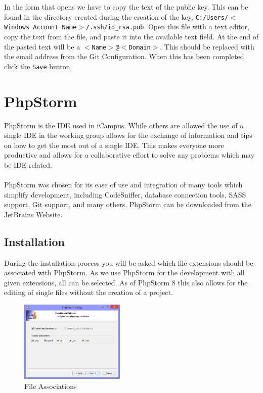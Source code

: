 \documentclass[]{report}
\begin{document}
\noindent
In the form that opens we have to copy the text of the public key. This can be found in the directory created during the creation of the key, \texttt{C:/Users/$<$Windows Account Name$>$/.ssh/id\_rsa.pub}. Open this file with a text editor, copy the text from the file, and paste it into the available text field. At the end of the pasted text will be a \texttt{$<$Name$>$@$<$Domain$>$}. This should be replaced with the email address from the Git Configuration. When this has been completed click the \texttt{Save} button.

\section{PhpStorm}
\label{sec:PHP-Storm}

PhpStorm is the IDE used in iCampus. While others are allowed the use of a single IDE in the working group allows for the exchange of information and tips on how to get the most out of a single IDE. This makes everyone more productive and allows for a collaborative effort to solve any problems which may be IDE related.\\
\\
PhpStorm was chosen for its ease of use and integration of many tools which simplify development, including CodeSniffer, database connection tools, SASS support, Git support, and many others. PhpStorm can be downloaded from the \href{http://www.jetbrains.com/phpstorm/}{JetBrains Website}.

\subsection{Installation}
During the installation process you will be asked which file extensions should be associated with PhpStorm. As we use PhpStorm for the development with all given extensions, all can be selected. As of PhpStorm 8 this also allows for the editing of single files without the creation of a project.\\

\begin{figure}[h] 
  \centering
     \includegraphics[width=5cm]{fileassociations.png}
  \caption{File Associations}
\end{figure}
\end{document}
